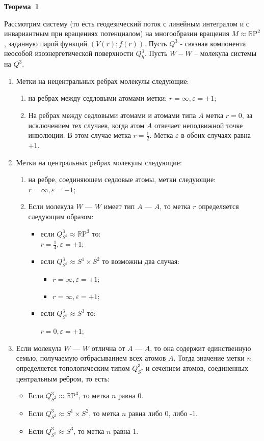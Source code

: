 \textbf{Теорема~1} \par
{Рассмотрим систему (то есть геодезический поток с линейным интегралом и с инвариантным при вращениях потенциалом) на многообразии вращения $M\approx \mathbb{R}\mathrm{P}^2$, заданную парой функций $(V(r);f(r))$.
Пусть $Q^3$ - связная компонента неособой изоэнергетической поверхности $Q^3_{h}$. Пусть $W -W$ -- молекула системы на $Q^3$.
\begin{enumerate}

\item Метки на нецентральных ребрах молекулы следующие:
\begin{enumerate}
  \item на ребрах между седловыми атомами метки: $r=\infty, \varepsilon=+1$;
 \item
  На ребрах между седловыми атомами и атомами типа $A$ метка $r=0$, за исключением тех случаев, когда атом $A$ отвечает неподвижной точке инволюции. В этом случае метка $r=\frac{1}{2}$. Метка $\varepsilon$ в обоих случаях равна $+1$.
\end{enumerate}
\item Метки на центральных ребрах молекулы следующие:
\begin{enumerate}
  \item
  на ребре, соединяющем седловые атомы, метки следующие: $r=\infty, \varepsilon=-1$;
  \item
  Если молекула $W$ --- $W$ имеет тип $A$ --- $A$, то метка $r$ определяется следующим образом:
  \begin{itemize}
  \item
  если $Q^{3}_{S^2}\approx \mathbb{R}\mathrm{P}^3$ то:
\\
  $r=\frac{1}{4}, \varepsilon=+1$;

\item
если $Q^{3}_{S^2}\approx S^1\times S^2$ то возможны два случая:
  \begin{itemize}
  \item  $r=\infty, \varepsilon=+1$;
  \item $r=\infty, \varepsilon=+1$;
    \end{itemize}
\item
если $Q^{3}_{S^2}\approx S^3$ то:
\par
 $r=0, \varepsilon=+1$;
  \end{itemize}
  \end{enumerate}
\item Если молекула $W$ --- $W$ отлична от $A$ --- $A$, то она содержит единственную семью, получаемую отбрасыванием всех атомов $A$. Тогда значение метки $n$ определяется топологическим типом $Q^{3}_{S^2}$ и сечением атомов, соединенных центральным ребром, то есть:
 \begin{itemize}
  \item Если $Q^{3}_{S^2}\approx \mathbb{R}\mathrm{P}^3$, то метка $n$ равна 0.
  \item Если  $Q^{3}_{S^2}\approx S^1\times S^2$, то метка $n$ равна либо 0, либо -1.
  \item Если  $Q^{3}_{S^2}\approx S^3$, то метка $n$ равна 1.
  \end{itemize}
  \end{enumerate}



}
